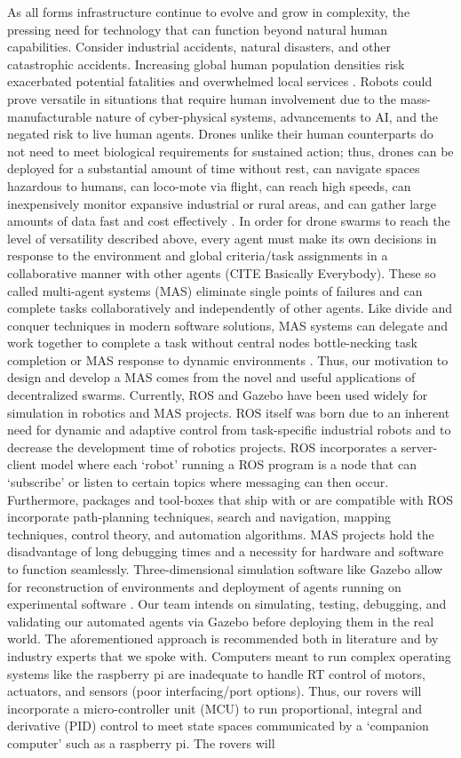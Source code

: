 \documentclass[conference]{IEEEtran}
\begin{document}
As all forms infrastructure continue to evolve and grow in complexity, the pressing need for technology that can function beyond natural human capabilities. Consider industrial accidents, natural disasters, and other catastrophic accidents. Increasing global human population densities risk exacerbated potential fatalities and overwhelmed local services \cite{RN94, RN100, RN104, RN106}. Robots could prove versatile in situations that require human involvement due to the mass-manufacturable nature of cyber-physical systems, advancements to AI, and the negated risk to live human agents. Drones unlike their human counterparts do not need to meet biological requirements for sustained action; thus, drones can be deployed for a substantial amount of time without rest, can navigate spaces hazardous to humans, can loco-mote via flight, can reach high speeds, can inexpensively monitor expansive industrial or rural areas, and can gather large amounts of data fast and cost effectively \cite{RN101}. In order for drone swarms to reach the level of versatility described above, every agent must make its own decisions in response to the environment and global criteria/task assignments in a collaborative manner with other agents (CITE Basically Everybody). These so called multi-agent systems (MAS) eliminate single points of failures and can complete tasks collaboratively and independently of other agents. Like divide and conquer techniques in modern software solutions, MAS systems can delegate and work together to complete a task without central nodes bottle-necking task completion or MAS response to dynamic environments \cite{RN100}. Thus, our motivation to design and develop a MAS comes from the novel and useful applications of decentralized swarms. Currently, ROS and Gazebo have been used widely for simulation in robotics and MAS projects. ROS itself was born due to an inherent need for dynamic and adaptive control from task-specific industrial robots and to decrease the development time of robotics projects. ROS incorporates a server-client model where each ‘robot’ running a ROS program is a node that can ‘subscribe’ or listen to certain topics where messaging can then occur. Furthermore, packages and tool-boxes that ship with or are compatible with ROS incorporate path-planning techniques, search and navigation, mapping techniques, control theory, and automation algorithms. MAS projects hold the disadvantage of long debugging times and a necessity for hardware and software to function seamlessly. Three-dimensional simulation software like Gazebo allow for reconstruction of environments and deployment of agents running on experimental software \cite{RN104}. Our team intends on simulating, testing, debugging, and validating our automated agents via Gazebo before deploying them in the real world. The aforementioned approach is recommended both in literature and by industry experts that we spoke with. Computers meant to run complex operating systems like the raspberry pi are inadequate to handle RT control of motors, actuators, and sensors (poor interfacing/port options). Thus, our rovers will incorporate a micro-controller unit (MCU) to run proportional, integral and derivative (PID) control to meet state spaces communicated by a ‘companion computer’ such as a raspberry pi. The rovers will 
\end{document}
